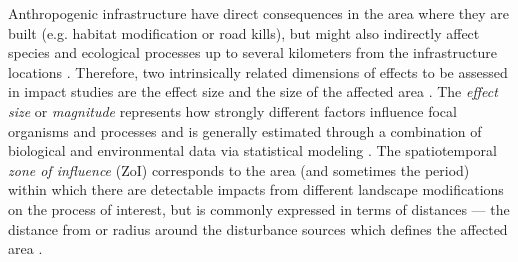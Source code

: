 \documentclass[titlepage]{article}
\begin{document}
Anthropogenic infrastructure have direct consequences in the area where they are built (e.g. habitat modification or road kills), but might also indirectly affect species and ecological processes up to several kilometers from the infrastructure locations \citep[e.g. reducing the probability of animal occurrence;][]{johnson_cumulative_2005,torres_assessing_2016}. Therefore, two intrinsically related dimensions of effects to be assessed in impact studies are the effect size and the size of the affected area \citep[Box 1; ][]{naugle_unifying_2011}. The \textit{effect size} or \textit{magnitude} represents how strongly different factors influence focal organisms and processes and is generally estimated through a combination of biological and environmental data via statistical modeling \citep[Box 1;][]{polfus_identifying_2011}. The spatiotemporal \textit{zone of influence} (ZoI) 
corresponds to the area (and sometimes the period) within which there are detectable impacts from different landscape modifications on the process of interest, but is commonly expressed in terms of distances --- the distance from or radius around the disturbance sources which defines the affected area \citep[Box 1;][]{ boulanger_estimating_2012}. 
\end{document}

